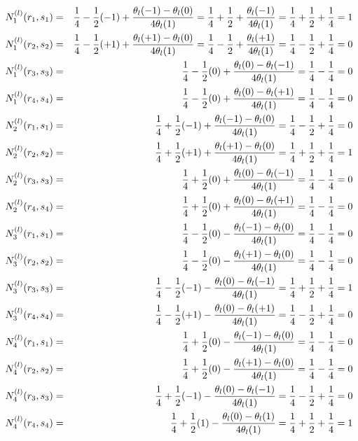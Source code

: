 \begin{eqnarray}
N_1^{(l)}(r_1,s_1) 
&=& \frac{1}{4} -\frac{1}{2} (-1) + \frac{\theta_l(-1)-\theta_l(0)}{4 \theta_l(1)}  
= \frac{1}{4} +\frac{1}{2}  + \frac{\theta_l(-1)}{4 \theta_l(1)}  
= \frac{1}{4} +\frac{1}{2}  + \frac{1}{4}   = 1 \nonumber\\
N_1^{(l)}(r_2,s_2)
&=& \frac{1}{4} -\frac{1}{2} (+1) + \frac{\theta_l(+1)-\theta_l(0)}{4 \theta_l(1)}  
= \frac{1}{4} -\frac{1}{2} + \frac{\theta_l(+1)}{4 \theta_l(1)}  
= \frac{1}{4} -\frac{1}{2} + \frac{1}{4}   = 0 \nonumber\\
N_1^{(l)}(r_3,s_3)
&=& \frac{1}{4} -\frac{1}{2} (0) + \frac{\theta_l(0)-\theta_l(-1)}{4 \theta_l(1)}  
= \frac14 -\frac14  = 0 \nonumber\\
N_1^{(l)}(r_4,s_4)
&=& \frac{1}{4} -\frac{1}{2} (0) + \frac{\theta_l(0)-\theta_l(+1)}{4 \theta_l(1)}  
= \frac14 -\frac14  = 0 \nonumber\\
N_2^{(l)}(r_1,s_1) 
&=& \frac{1}{4} + \frac{1}{2} (-1) + \frac{\theta_l(-1)-\theta_l(0)}{4 \theta_l(1)}  
= \frac14 -\frac12 + \frac14 = 0 \nonumber\\
N_2^{(l)}(r_2,s_2)
&=& \frac{1}{4} + \frac{1}{2} (+1) + \frac{\theta_l(+1)-\theta_l(0)}{4 \theta_l(1)}  
= \frac14 + \frac12 + \frac14 =1 \nonumber\\
N_2^{(l)}(r_3,s_3)
&=& \frac{1}{4} + \frac{1}{2} (0) + \frac{\theta_l(0)-\theta_l(-1)}{4 \theta_l(1)}  
= \frac14 - \frac14 = 0 \nonumber\\
N_2^{(l)}(r_4,s_4)
&=& \frac{1}{4} + \frac{1}{2} (0) + \frac{\theta_l(0)-\theta_l(+1)}{4 \theta_l(1)}  
= \frac14 - \frac14 = 0 \nonumber\\
N_3^{(l)}(r_1,s_1)
&=& \frac{1}{4} - \frac{1}{2} (0) - \frac{\theta_l(-1)-\theta_l(0)}{4 \theta_l(1)} 
= \frac14 -\frac14 = 0\nonumber\\
N_3^{(l)}(r_2,s_2)
&=& \frac{1}{4} - \frac{1}{2} (0) - \frac{\theta_l(+1)-\theta_l(0)}{4 \theta_l(1)} 
= \frac14 -\frac14 = 0\nonumber\\
N_3^{(l)}(r_3,s_3)
&=& \frac{1}{4} - \frac{1}{2} (-1) - \frac{\theta_l(0)-\theta_l(-1)}{4 \theta_l(1)} 
= \frac14 +\frac12 + \frac14 = 1\nonumber\\
N_3^{(l)}(r_4,s_4)
&=& \frac{1}{4} - \frac{1}{2} (+1) - \frac{\theta_l(0)-\theta_l(+1)}{4 \theta_l(1)} 
= \frac14 -\frac12 + \frac14 = 0\nonumber\\
N_4^{(l)}(r_1,s_1)
&=& \frac{1}{4} + \frac{1}{2} (0) - \frac{\theta_l(-1)-\theta_l(0)}{4 \theta_l(1)}  
= \frac14 -\frac14 =0\nonumber\\
N_4^{(l)}(r_2,s_2)
&=& \frac{1}{4} + \frac{1}{2} (0) - \frac{\theta_l(+1)-\theta_l(0)}{4 \theta_l(1)}  
= \frac14 -\frac14 =0\nonumber\\
N_4^{(l)}(r_3,s_3)
&=& \frac{1}{4} + \frac{1}{2} (-1) - \frac{\theta_l(0)-\theta_l(-1)}{4 \theta_l(1)}  
= \frac14 -\frac12 +\frac14 = 0 \nonumber\\
N_4^{(l)}(r_4,s_4)
&=& \frac{1}{4} + \frac{1}{2} (1) - \frac{\theta_l(0)-\theta_l(1)}{4 \theta_l(1)}  
= \frac14 +\frac12 +\frac14 = 1 \nonumber
\end{eqnarray}

